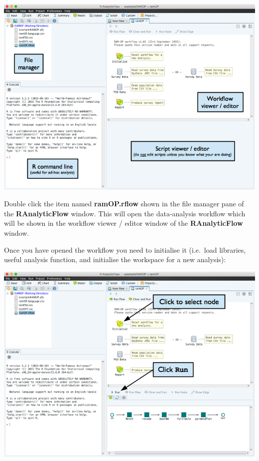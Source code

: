 \documentclass[12pt,a4paper]{book}
\theoremstyle{definition}
\theoremstyle{definition}
\theoremstyle{definition}
\theoremstyle{remark}
\begin{document}
\begin{center}\includegraphics{figures/openWorkflowRAF} \end{center}

Double click the item named \textbf{ramOP.rflow} shown in the file
manager pane of the \textbf{RAnalyticFlow} window. This will open the
data-analysis workflow which will be shown in the workflow viewer /
editor window of the \textbf{RAnalyticFlow} window.

Once you have opened the workflow you need to initialise it (i.e.~load
libraries, useful analysis function, and initialise the workspace for a
new analysis):

\begin{center}\includegraphics{figures/runWorkflowRAF} \end{center}
\end{document}
